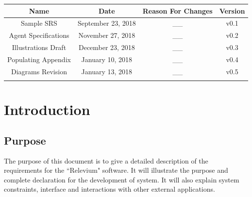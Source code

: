 \documentclass{scrreprt}
\begin{document}
\begin{center}
    \begin{tabular}{|c|c|c|c|}
        \hline
	    Name & Date & Reason For Changes & Version\\
        \hline
	   Sample SRS & September 23, 2018 & __ & v0.1\\
        \hline
        Agent Specifications & November 27, 2018 & __ & v0.2\\
        \hline
        Illustrations Draft & December 23, 2018 & __ & v0.3\\
        \hline
        Populating Appendix & January 10, 2018 & __ & v0.4\\
        \hline
        Diagrams Revision & January 13, 2018 & __ & v0.5\\
        \hline
	   & & & \\
        \hline
    \end{tabular}
\end{center}

\chapter{Introduction}

\section{Purpose}

The purpose of this document is to give a detailed description of the requirements for the ``Relevium" software. It will illustrate the purpose and complete declaration for the development of system. It will also explain system constraints, interface and interactions with other external applications.

\end{document}
